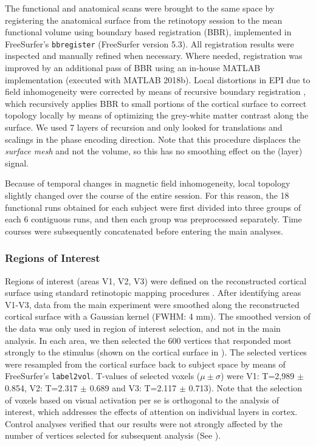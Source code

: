 \documentclass[9pt,lineno]{aperture}
\begin{document}
The functional and anatomical scans were brought to the same space by registering the anatomical surface from the retinotopy session to the mean functional volume using boundary based registration (BBR), implemented in FreeSurfer's \texttt{bbregister} \citep{Greve2009} (FreeSurfer version 5.3). All registration results were inspected and manually refined when necessary. Where needed, registration was improved by an additional pass of BBR using an in-house MATLAB implementation (executed with MATLAB 2018b). Local distortions in EPI due to field inhomogeneity were corrected by means of recursive boundary registration \citep{VanMourik2019}, which recursively applies BBR to small portions of the cortical surface to correct topology locally by means of optimizing the grey-white matter contrast along the surface. We used 7 layers of recursion and only looked for translations and scalings in the phase encoding direction. Note that this procedure displaces the \textit{surface mesh} and not the volume, so this has no smoothing effect on the (layer) signal. 

Because of temporal changes in magnetic field inhomogeneity, local topology slightly changed over the course of the entire session. For this reason, the 18 functional runs obtained for each subject were first divided into three groups of each 6 contiguous runs, and then each group was preprocessed separately. Time courses were subsequently concatenated before entering the main analyses.

\subsubsection{Regions of Interest}
Regions of interest (areas V1, V2, V3) were defined on the reconstructed cortical surface using standard retinotopic mapping procedures \citep{Sereno1995,DeYoe1996,Engel1997}. After identifying areas V1-V3, data from the main experiment were smoothed along the reconstructed cortical surface with a Gaussian kernel (FWHM: 4 mm). The smoothed version of the data was only used in region of interest selection, and not in the main analysis. In each area, we then selected the 600 vertices that responded most strongly to the stimulus (shown on the cortical surface in ). The selected vertices were resampled from the cortical surface back to subject space by means of FreeSurfer's \texttt{label2vol}. T-values of selected voxels ($\mu \pm \sigma$) were V1: T=2,989 $\pm$ 0.854, V2: T=2.317 $\pm$ 0.689 and V3: T=2.117 $\pm$ 0.713). Note that the selection of voxels based on visual activation per se is orthogonal to the analysis of interest, which addresses the effects of attention on individual layers in cortex. Control analyses verified that our results were not strongly affected by the number of vertices selected for subsequent analysis (See ).
\end{document}
